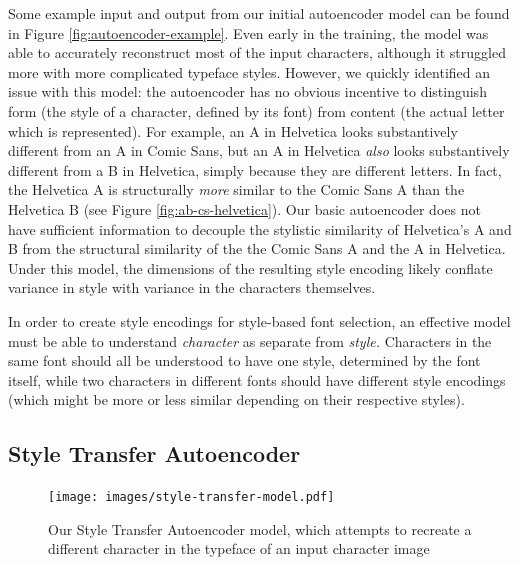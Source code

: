 Some example input and output from our initial autoencoder model can be found in Figure \ref{fig:autoencoder-example}. Even early in the training, the model was able to accurately reconstruct most of the input characters, although it struggled more with more complicated typeface styles. However, we quickly identified an issue with this model: the autoencoder has no obvious incentive to distinguish form (the style of a character, defined by its font) from content (the actual letter which is represented). For example, an { A} in Helvetica looks substantively different from an { A} in Comic Sans, but an { A} in Helvetica \textit{also} looks substantively different from a { B} in Helvetica, simply because they are different letters. In fact, the Helvetica { A} is structurally \emph{more} similar to the Comic Sans { A} than the Helvetica { B} (see Figure \ref{fig:ab-cs-helvetica}). Our basic autoencoder does not have sufficient information to decouple the stylistic similarity of Helvetica's { A} and { B} from the structural similarity of the the Comic Sans { A} and the { A} in Helvetica. Under this model, the dimensions of the resulting style encoding likely conflate variance in style with variance in the characters themselves.

In order to create style encodings for style-based font selection, an effective model must be able to understand \emph{character} as separate from \emph{style.} Characters in the same font should all be understood to have one style, determined by the font itself, while two characters in different fonts should have different style encodings (which might be more or less similar depending on their respective styles).

\subsection{Style Transfer Autoencoder} \label{style-transfer}

\begin{figure}[h]
    \centering
    \texttt{[image: images/style-transfer-model.pdf]}
    \caption{Our Style Transfer Autoencoder model, which attempts to recreate a different character in the typeface of an input character image}
    \label{fig:style-transfer-model}
\end{figure}

